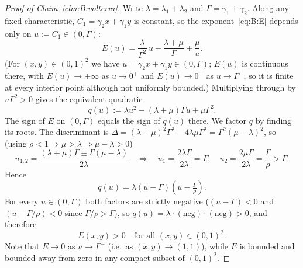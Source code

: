 \begin{proof}[Proof of Claim~\ref{clm:B:volterra}]
Write $\lambda = \lambda_1+\lambda_2$ and $\Gamma = \gamma_1+\gamma_2$. Along any
fixed characteristic, $C_1 = \gamma_2 x + \gamma_1 y$ is constant, so the
exponent~\eqref{eq:B:E} depends only on $u := C_1\in(0,\Gamma)$:
\begin{equation}
    E(u) = \frac{\lambda}{\Gamma^2}\,u - \frac{\lambda+\mu}{\Gamma} + \frac{\mu}{u}.
    \label{eq:B:E_u}
\end{equation}
(For $(x,y)\in(0,1)^2$ we have $u = \gamma_2 x+\gamma_1 y \in (0,\Gamma)$; $E(u)$ is
continuous there, with $E(u)\to+\infty$ as $u\to0^+$ and $E(u)\to0^+$ as
$u\to\Gamma^-$, so it is finite at every interior point although not uniformly bounded.)
Multiplying through by
$u\Gamma^2>0$ gives the equivalent quadratic
\begin{equation}
    q(u) := \lambda u^2 - (\lambda+\mu)\Gamma u + \mu\Gamma^2.
    \label{eq:B:quadratic}
\end{equation}
The sign of $E$ on $(0,\Gamma)$ equals the sign of $q(u)$ there.  We
factor $q$ by finding its roots.  The discriminant is
$\Delta = (\lambda+\mu)^2\Gamma^2 - 4\lambda\mu\Gamma^2 = \Gamma^2(\mu-\lambda)^2$,
so (using $\rho<1 \Rightarrow \mu>\lambda \Rightarrow \mu-\lambda>0$)
\begin{equation}
    u_{1,2} = \frac{(\lambda+\mu)\Gamma \pm \Gamma(\mu-\lambda)}{2\lambda}
    \quad\Longrightarrow\quad
    u_1 = \frac{2\lambda\Gamma}{2\lambda} = \Gamma,
    \quad
    u_2 = \frac{2\mu\Gamma}{2\lambda} = \frac{\Gamma}{\rho} > \Gamma.
    \label{eq:B:roots}
\end{equation}
Hence
\begin{equation}
    q(u) = \lambda(u - \Gamma)\!\left(u - \tfrac{\Gamma}{\rho}\right).
    \label{eq:B:q_factored}
\end{equation}
For every $u\in(0,\Gamma)$ both factors are strictly negative
($(u-\Gamma)<0$ and $(u-\Gamma/\rho)<0$ since $\Gamma/\rho>\Gamma$),
so $q(u)=\lambda\cdot(\text{neg})\cdot(\text{neg})>0$, and therefore
\begin{equation}
    E(x,y) > 0 \quad \text{for all } (x,y)\in(0,1)^2.
    \label{eq:B:E_positive}
\end{equation}
Note that $E\to0$ as $u\to\Gamma^-$ (i.e.\ as $(x,y)\to(1,1)$), while $E$ is
bounded and bounded away from zero in any compact subset of $(0,1)^2$.


\end{proof}
